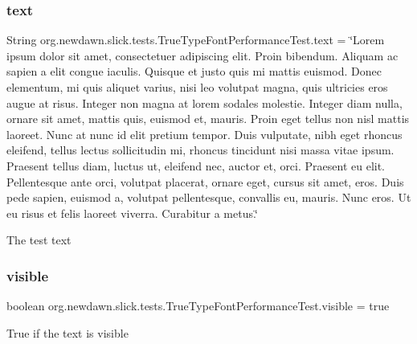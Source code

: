 \subsubsection{\texorpdfstring{text}{text}}
{\footnotesize\ttfamily String org.\+newdawn.\+slick.\+tests.\+True\+Type\+Font\+Performance\+Test.\+text = \char`\"{}Lorem ipsum dolor sit amet, consectetuer adipiscing elit. Proin bibendum. Aliquam ac sapien a elit congue iaculis. Quisque et justo quis mi mattis euismod. Donec elementum, mi quis aliquet varius, nisi leo volutpat magna, quis ultricies eros augue at risus. Integer non magna at lorem sodales molestie. Integer diam nulla, ornare sit amet, mattis quis, euismod et, mauris. Proin eget tellus non nisl mattis laoreet. Nunc at nunc id elit pretium tempor. Duis vulputate, nibh eget rhoncus eleifend, tellus lectus sollicitudin mi, rhoncus tincidunt nisi massa vitae ipsum. Praesent tellus diam, luctus ut, eleifend nec, auctor et, orci. Praesent eu elit. Pellentesque ante orci, volutpat placerat, ornare eget, cursus sit amet, eros. Duis pede sapien, euismod a, volutpat pellentesque, convallis eu, mauris. Nunc eros. Ut eu risus et felis laoreet viverra. Curabitur a metus.\char`\"{}\hspace{0.3cm}{\ttfamily [private]}}

The test text \mbox{\label{classorg_1_1newdawn_1_1slick_1_1tests_1_1_true_type_font_performance_test_aff78102bb4082a1dd8e34dc6152a51b2}} 
\subsubsection{\texorpdfstring{visible}{visible}}
{\footnotesize\ttfamily boolean org.\+newdawn.\+slick.\+tests.\+True\+Type\+Font\+Performance\+Test.\+visible = true\hspace{0.3cm}{\ttfamily [private]}}

True if the text is visible 